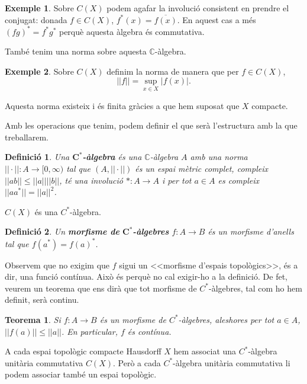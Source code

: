 \documentclass{article}
\newtheorem{teorema}{Teorema}
\newtheorem{definicio}{Definici\'{o}}
\theoremstyle{definition}
\newtheorem{exemple}{Exemple}
\begin{document}
\begin{exemple}
Sobre $C(X)$ podem agafar la involuci\'{o} consistent en prendre el conjugat: donada $f\in C(X)$, $f^*(x)=\overline{f(x)}$. En aquest cas a m\'{e}s $(fg)^*=f^*g^*$ perqu\`{e} aquesta \`{a}lgebra \'{e}s commutativa.
\end{exemple}

Tamb\'{e} tenim una norma sobre aquesta $\mathbb{C}$-\`{a}lgebra.

\begin{exemple}
Sobre $C(X)$ definim la norma de manera que per $f\in C(X)$,
\[||f||=\sup_{x\in X}|f(x)|.\]

Aquesta norma existeix i \'{e}s finita gr\`{a}cies a que hem suposat que $X$ compacte.
\end{exemple}

Amb les operacions que tenim, podem definir el que ser\`{a} l'estructura amb la que treballarem.

\begin{definicio}
Una $\boldsymbol{C^*}$\textbf{-\`{a}lgebra} \'{e}s una $\mathbb{C}$-\`{a}lgebra $A$ amb una norma $||\cdot||:A\rightarrow[0,\infty)$ tal que $(A,||\cdot||)$ \'{e}s un espai m\`{e}tric complet, compleix $||ab||\leq||a||||b||$, t\'{e} una involuci\'{o} $*:A\rightarrow A$ i per tot $a\in A$ es compleix $||aa^*||=||a||^2$.
\end{definicio}

$C(X)$ \'{e}s una $C^*$-\`{a}lgebra.

\begin{definicio}
Un \textbf{morfisme de }$\boldsymbol{C^*}$\textbf{-\`{a}lgebres} $f:A\rightarrow B$ \'{e}s un morfisme d'anells tal que $f(a^*)=f(a)^*$.
\end{definicio}

Observem que no exigim que $f$ sigui un <<morfisme d'espais topol\`{o}gics>>, \'{e}s a dir, una funci\'{o} cont\'{i}nua. Aix\`{o} \'{e}s perqu\`{e} no cal exigir-ho a la definici\'{o}. De fet, veurem un teorema que ens dir\`{a} que tot morfisme de $C^*$-\`{a}lgebres, tal com ho hem definit, ser\`{a} continu.

\begin{teorema}
Si $f:A\rightarrow B$ \'{e}s un morfisme de $C^*$-\`{a}lgebres, aleshores per tot $a\in A$, $||f(a)||\leq||a||$. En particular, $f$ \'{e}s cont\'{i}nua.
\end{teorema}

A cada espai topol\`{o}gic compacte Hausdorff $X$ hem associat una $C^*$-\`{a}lgebra unit\`{a}ria commutativa $C(X)$. Per\`{o} a cada $C^*$-\`{a}lgebra unit\`{a}ria commutativa li podem associar tamb\'{e} un espai topol\`{o}gic.
\end{document}
